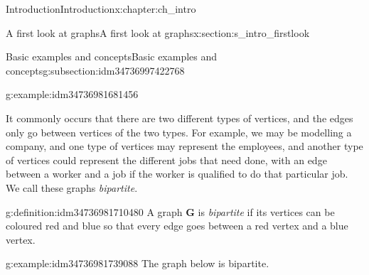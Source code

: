 \documentclass[oneside,10pt,]{book}
\numberwithin{equation}{section}
\newcommand{\bfG}{\mathbf{G}}
\begin{document}
\begin{chapterptx}{Introduction}{}{Introduction}{}{}{x:chapter:ch_intro}
\begin{sectionptx}{A first look at graphs}{}{A first look at graphs}{}{}{x:section:s_intro_firstlook}
\begin{subsectionptx}{Basic examples and concepts}{}{Basic examples and concepts}{}{}{g:subsection:idm34736997422768}
\begin{example}{}{g:example:idm34736981681456}
\begin{image}{0.05}{0.9}{0.05}
{
}%
\end{image}%
\end{example}
It commonly occurs that there are two different types of vertices, and the edges only go between vertices of the two types.  For example, we may be modelling a company, and one type of vertices may represent the employees, and another type of vertices could represent the different jobs that need done, with an edge between a worker and a job if the worker is qualified to do that particular job.  We call these graphs \emph{bipartite}.%
\begin{definition}{}{g:definition:idm34736981710480}%
A graph \(\bfG\) is \emph{bipartite} if its vertices can be coloured red and blue so that every edge goes between a red vertex and a blue vertex.%
\end{definition}
\begin{example}{}{g:example:idm34736981739088}%
The graph below is bipartite.%
\begin{image}{0.05}{0.9}{0.05}%
\end{image}
\end{example}
\end{subsectionptx}
\end{sectionptx}
\end{chapterptx}
\end{document}
